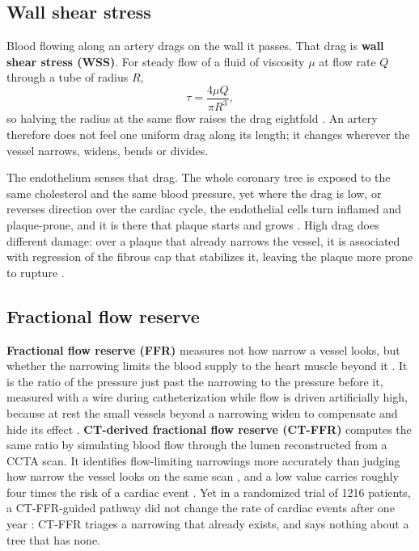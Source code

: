 \subsection{Wall shear stress}

Blood flowing along an artery drags on the wall it passes.
That drag is \textbf{wall shear stress (WSS)}.
For steady flow of a fluid of viscosity $\mu$ at flow rate $Q$ through a tube of radius $R$,
%
\begin{equation}
  \tau = \frac{4 \mu Q}{\pi R^{3}},
  \label{eq:wss}
\end{equation}
%
so halving the radius at the same flow raises the drag eightfold \cite{rampidis2022geometry}.
An artery therefore does not feel one uniform drag along its length; it changes wherever the vessel
narrows, widens, bends or divides.

The endothelium senses that drag.
The whole coronary tree is exposed to the same cholesterol and the same blood pressure, yet where
the drag is low, or reverses direction over the cardiac cycle, the endothelial cells turn inflamed
and plaque-prone, and it is there that plaque starts and grows \cite{chatzizisis2007ess}.
High drag does different damage: over a plaque that already narrows the vessel, it is associated
with regression of the fibrous cap that stabilizes it, leaving the plaque more prone to rupture
\cite{bajraktari2021highwss}.

\subsection{Fractional flow reserve}
\label{sec:ffr}

\textbf{Fractional flow reserve (FFR)} measures not how narrow a vessel looks, but whether the
narrowing limits the blood supply to the heart muscle beyond it \cite{knuuti2019esc}.
It is the ratio of the pressure just past the narrowing to the pressure before it, measured with a
wire during catheterization while flow is driven artificially high, because at rest the small
vessels beyond a narrowing widen to compensate and hide its effect \cite{duncker2015regulation}.
\textbf{CT-derived fractional flow reserve (CT-FFR)} computes the same ratio by simulating blood
flow through the lumen reconstructed from a CCTA scan.
It identifies flow-limiting narrowings more accurately than judging how narrow the vessel looks on
the same scan \cite{norgaard2014nxt}, and a low value carries roughly four times the risk of a
cardiac event \cite{biswas2026ffrct}.
Yet in a randomized trial of 1216 patients, a CT-FFR-guided pathway did not change the rate of
cardiac events after one year \cite{yang2023target}: CT-FFR triages a narrowing that already
exists, and says nothing about a tree that has none.


